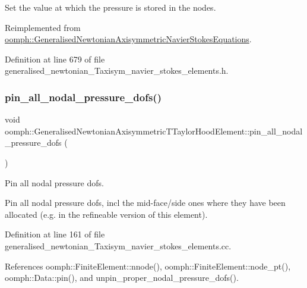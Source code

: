Set the value at which the pressure is stored in the nodes. 



Reimplemented from \hyperlink{classoomph_1_1GeneralisedNewtonianAxisymmetricNavierStokesEquations_aaaba5e4ead0e847c21fc7e871121400a}{oomph\+::\+Generalised\+Newtonian\+Axisymmetric\+Navier\+Stokes\+Equations}.



Definition at line 679 of file generalised\+\_\+newtonian\+\_\+\+Taxisym\+\_\+navier\+\_\+stokes\+\_\+elements.\+h.

\mbox{\label{classoomph_1_1GeneralisedNewtonianAxisymmetricTTaylorHoodElement_ad8861d17694cf61211abff428a80ef97}} 
\subsubsection{\texorpdfstring{pin\+\_\+all\+\_\+nodal\+\_\+pressure\+\_\+dofs()}{pin\_all\_nodal\_pressure\_dofs()}}
{\footnotesize\ttfamily void oomph\+::\+Generalised\+Newtonian\+Axisymmetric\+T\+Taylor\+Hood\+Element\+::pin\+\_\+all\+\_\+nodal\+\_\+pressure\+\_\+dofs (\begin{DoxyParamCaption}{ }\end{DoxyParamCaption})\hspace{0.3cm}{\ttfamily [protected]}}



Pin all nodal pressure dofs. 

Pin all nodal pressure dofs, incl the mid-\/face/side ones where they have been allocated (e.\+g. in the refineable version of this element). 

Definition at line 161 of file generalised\+\_\+newtonian\+\_\+\+Taxisym\+\_\+navier\+\_\+stokes\+\_\+elements.\+cc.



References oomph\+::\+Finite\+Element\+::nnode(), oomph\+::\+Finite\+Element\+::node\+\_\+pt(), oomph\+::\+Data\+::pin(), and unpin\+\_\+proper\+\_\+nodal\+\_\+pressure\+\_\+dofs().



